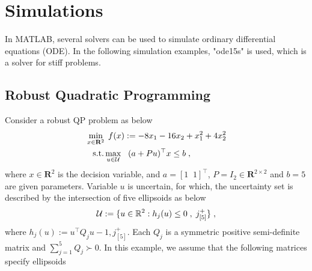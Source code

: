 \documentclass[journal,twoside,web]{ieeecolor}
\begin{document}
\section{Simulations}\label{section_simulations}
In MATLAB, several solvers can be used to simulate ordinary differential equations (ODE). In the following simulation examples, "ode15s" is used, which is a solver for stiff problems.

\subsection{Robust Quadratic Programming}

Consider a robust QP problem as below
\begin{align} \label{ro_simulation}
&\min_{x \in \mathbf{R}^2} \;f(x):=-8x_1-16x_2+x_1^2+4x_2^2\nonumber\\
&\;\;\;\text{s.t.} \max_{u\in {\cal U}} \;\;\; (a+Pu)^\top x\leq b\;,
\end{align}
where $x \in \mathbf{R}^2$ is the decision variable, and $a =[1\;\;1]^\top$, $P=I_2 \in \mathbf{R}^{2 \times 2}$ and $b=5$ are given parameters. Variable $u$ is uncertain, for which, the uncertainty set is described by the intersection of five ellipsoids as below
\begin{align*}{\cal U}:=\{u \in \mathbb{R}^{2}:h_{j}(u) \leq 0\;,\; j^+_{[5]}\}\;,\end{align*}
where 
$h_j(u):=u^\top Q_j u-1, j^+_{[5]}$. Each $Q_{j}$ is a symmetric positive semi-definite matrix and $ \sum_{j=1}^{5} Q_j \succ 0$. In this example, we assume that the following matrices specify ellipsoids
\end{document}

